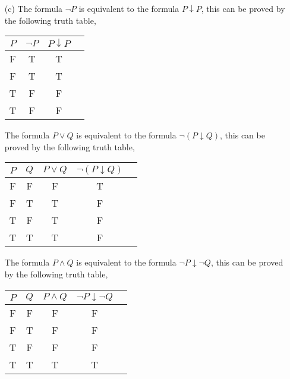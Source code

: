 \documentclass{article} %
\begin{document}
\begin{enumerate}
\begin{itemize}
        \item[(c)] The formula $\neg P$ is equivalent to the formula $P \downarrow P$, this can be proved by the following truth table,
        \begin{center}
            \begin{tabular}{cccc}
                $P$ & $\neg P$ & $P \downarrow P$ \\
                \hline
                F & T & T \\
                F & T & T \\
                T & F & F \\
                T & F & F \\
            \end{tabular}
        \end{center} 

        The formula $P \lor Q$ is equivalent to the formula $\neg (P \downarrow Q)$, this can be proved by the following truth table,

        \begin{center}
        \begin{tabular}{ccccc}
            $P$ & $Q$ & $P \lor Q$ & $\neg (P \downarrow Q)$ \\
            \hline
            F & F & F & T \\
            F & T & T & F \\
            T & F & T & F \\
            T & T & T & F \\
        \end{tabular}
        \end{center}

        The formula $P \land Q$ is equivalent to the formula $\neg P \downarrow \neg Q$, this can be proved by the following truth table, 

        \begin{center}
        \begin{tabular}{ccccc}
            $P$ & $Q$ & $P \land Q$ & $\neg P \downarrow \neg Q$ \\
            \hline
            F & F & F & F \\
            F & T & F & F \\
            T & F & F & F \\
            T & T & T & T \\
        \end{tabular}
        \end{center}


\end{itemize}
\end{enumerate}
\end{document}
